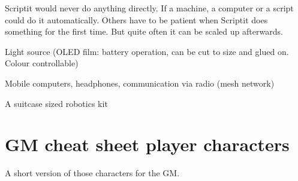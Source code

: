 \begin{npcBox}[title=Scriptit - a Pioneer Automationationeer]
    \begin{stressSection}
    \end{stressSection}
    \begin{tabularx}{\textwidth}{ XX }
    \end{tabularx}

    \begin{consequences}
    \item {}
    \item {}
    \item {}
    \end{consequences}

    \begin{npcDescription}
    Scriptit would never do anything directly. If a machine, a computer or a script could do it automatically. Others have to be patient when Scriptit does something for the first time. But quite often it can be scaled up afterwards.

    \end{npcDescription}

    \begin{equipment}
        \item Light source (OLED film: battery operation, can be cut to size and glued on. Colour controllable)
        \item Mobile computers, headphones, communication via radio (mesh network)
        \item A suitcase sized robotics kit
    \end{equipment}
\end{npcBox}

\newpage
\section{GM cheat sheet player characters}

A short version of those characters for the GM.

